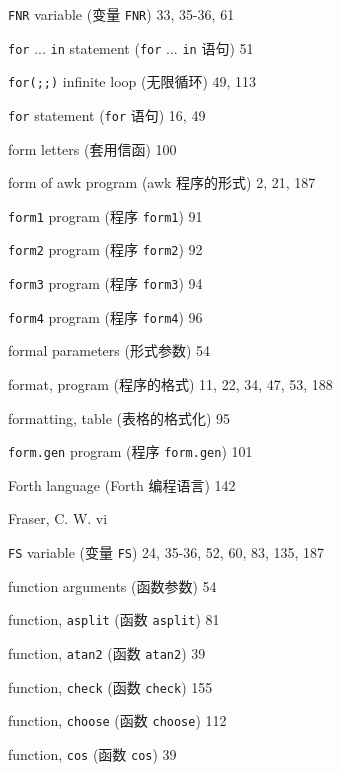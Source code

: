 \begin{multicols}{3}
\hangindent=3pc  \verb'FNR' variable (变量 \verb'FNR') 33, 35-36, 61

\hangindent=3pc  \verb'for' ... \verb'in' statement (\verb'for'
... \verb'in' 语句) 51

\hangindent=3pc  \verb'for(;;)' infinite loop (无限循环) 49, 113

\hangindent=3pc  \verb'for' statement (\verb'for' 语句) 16, 49

\hangindent=3pc  form letters (套用信函) 100

\hangindent=3pc  form of awk program (awk 程序的形式) 2, 21, 187

\hangindent=3pc  \verb'form1' program (程序 \verb'form1') 91

\hangindent=3pc  \verb'form2' program (程序 \verb'form2') 92

\hangindent=3pc  \verb'form3' program (程序 \verb'form3') 94

\hangindent=3pc  \verb'form4' program (程序 \verb'form4') 96

\hangindent=3pc  formal parameters (形式参数) 54

\hangindent=3pc  format, program (程序的格式)
11, 22, 34, 47, 53, 188

\hangindent=3pc  formatting, table (表格的格式化) 95

\hangindent=3pc  \verb'form.gen' program (程序 \verb'form.gen') 101

\hangindent=3pc  Forth language (Forth 编程语言) 142

\hangindent=3pc  Fraser, C. W. vi

\hangindent=3pc  \verb'FS' variable (变量 \verb'FS')
24, 35-36, 52, 60, 83, 135, 187

\hangindent=3pc  function arguments (函数参数) 54

\hangindent=3pc  function, \verb'asplit' (函数 \verb'asplit') 81

\hangindent=3pc  function, \verb'atan2' (函数 \verb'atan2') 39

\hangindent=3pc  function, \verb'check' (函数 \verb'check') 155

\hangindent=3pc  function, \verb'choose' (函数 \verb'choose') 112

\hangindent=3pc  function, \verb'cos' (函数 \verb'cos') 39


\end{multicols}
